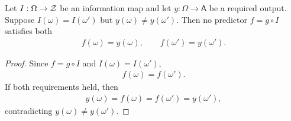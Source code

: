\begin{theorem}
\label{thm:contradiction:formal}
Let $I:\Omega\to\mathcal{Z}$ be an information map and let $y:\Omega\to\mathsf A$ be a required output. Suppose $I(\omega)=I(\omega')$ but $y(\omega)\ne y(\omega')$. Then no predictor $f=g\circ I$ satisfies both
\begin{align*}
f(\omega)=y(\omega),\qquad f(\omega')=y(\omega').
\end{align*}
\end{theorem}
\begin{proof}
Since $f=g\circ I$ and $I(\omega)=I(\omega')$,
\begin{align*}
f(\omega)=f(\omega').
\end{align*}
If both requirements held, then
\begin{align*}
y(\omega)=f(\omega)=f(\omega')=y(\omega'),
\end{align*}
contradicting $y(\omega)\ne y(\omega')$.
\end{proof}

